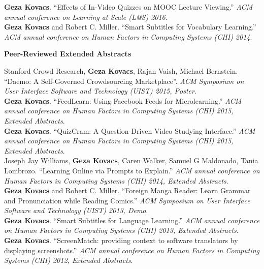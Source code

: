 \documentclass[10pt,A4]{article}
\newcommand{\cvsection}[1]
{
	\begin{center}
		\large\textcolor{sectcol}{\textbf{#1}}
	\end{center}
}
\begin{document}
\textbf{Geza Kovacs}. ``Effects of In-Video Quizzes on MOOC Lecture Viewing.'' \emph{ACM annual conference on Learning at Scale (L@S) 2016}.\\ %

\textbf{Geza Kovacs} and Robert C. Miller. ``Smart Subtitles for Vocabulary Learning.'' \emph{ACM annual conference on Human Factors in Computing Systems (CHI) 2014}.\\ %

\cvsection{Peer-Reviewed Extended Abstracts}

Stanford Crowd Research, \textbf{Geza Kovacs}, Rajan Vaish, Michael Bernstein. ``Daemo: A Self-Governed Crowdsourcing Marketplace''. \emph{ACM Symposium on User Interface Software and Technology (UIST) 2015, Poster}.\\

\textbf{Geza Kovacs}. ``FeedLearn: Using Facebook Feeds for Microlearning.'' \emph{ACM annual conference on Human Factors in Computing Systems (CHI) 2015, Extended Abstracts}.\\ %

\textbf{Geza Kovacs}. ``QuizCram: A Question-Driven Video Studying Interface.'' \emph{ACM annual conference on Human Factors in Computing Systems (CHI) 2015, Extended Abstracts}.\\

Joseph Jay Williams, \textbf{Geza Kovacs}, Caren Walker, Samuel G Maldonado, Tania Lombrozo. ``Learning Online via Prompts to Explain.'' \emph{ACM annual conference on Human Factors in Computing Systems (CHI) 2014, Extended Abstracts}.\\

\textbf{Geza Kovacs} and Robert C. Miller. ``Foreign Manga Reader: Learn Grammar and Pronunciation while Reading Comics.'' \emph{ACM Symposium on User Interface Software and Technology (UIST) 2013, Demo}.\\

\textbf{Geza Kovacs}. ``Smart Subtitles for Language Learning.'' \emph{ACM annual conference on Human Factors in Computing Systems (CHI) 2013, Extended Abstracts}.\\ %

\textbf{Geza Kovacs}. ``ScreenMatch: providing context to software translators by displaying screenshots.'' \emph{ACM annual conference on Human Factors in Computing Systems (CHI) 2012, Extended Abstracts}.\\ %
\end{document}
